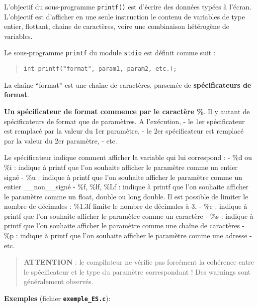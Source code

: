 \documentclass[11pt]{article}
\begin{document}
L'objectif du sous-programme \texttt{printf()} est d'écrire des données
typées à l'écran. L'objectif est d'afficher en une seule instruction le
contenu de variables de type entier, flottant, chaine de caractères,
voire une combinaison hétérogène de variables.

Le sous-programme \texttt{printf} du module \texttt{stdio} est définit
comme suit :

\begin{quote}
\texttt{int\ printf("format",\ param1,\ param2,\ etc.);}
\end{quote}

La chaîne ``format'' est une chaîne de caractères, parsemée de
\textbf{spécificateurs de format}.

\textbf{Un spécificateur de format commence par le caractère \%}. Il y
autant de spécificateurs de format que de paramètres. A l'exécution, -
le 1er spécificateur est remplacé par la valeur du 1er paramètre, - le
2er spécificateur est remplacé par la valeur du 2er paramètre, - etc.

Le spécificateur indique comment afficher la variable qui lui correspond
: - \%d ou \%i : indique à printf que l'on souhaite afficher le
paramètre comme un entier signé - \%u : indique à printf que l'on
souhaite afficher le paramètre comme un entier \_\_non\_\_signé - \%f,
\%lf, \%Lf : indique à printf que l'on souhaite afficher le paramètre
comme un float, double ou long double. Il est possible de limiter le
nombre de décimales : \%1.3f limite le nombre de décimales à 3. - \%c :
indique à printf que l'on souhaite afficher le paramètre comme un
caractère - \%s : indique à printf que l'on souhaite afficher le
paramètre comme une chaîne de caractères - \%p : indique à printf que
l'on souhaite afficher le paramètre comme une adresse - etc.

\begin{quote}
\textbf{ATTENTION} : le compilateur ne vérifie pas forcément la
cohérence entre le spécificateur et le type du paramètre correspondant !
Des warnings sont généralement observés.
\end{quote}

\textbf{Exemples} (fichier \textbf{\texttt{exemple\_ES.c}}):
\end{document}
